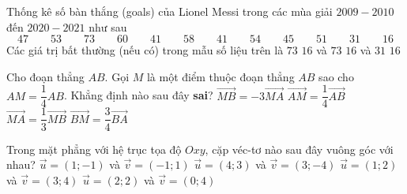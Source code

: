 \begin{ex}%
   Thống kê số bàn thắng (goals) của Lionel Messi trong các mùa giải $2009-2010$ đến $2020-2021$ như sau
   \[47\qquad 53 \qquad 73 \qquad 60 \qquad 41 \qquad 58 \qquad 41 \qquad 54 \qquad 45 \qquad 51\qquad 31 \qquad 16\]
   Các giá trị bất thường (nếu có) trong mẫu số liệu trên là
   \choice
   {$73$}
   {$16$ và $73$}
   {$16$ và $31$}
   {\True $16$}
\end{ex}

\begin{ex}%
   Cho đoạn thẳng $AB$. Gọi $M$ là một điểm thuộc đoạn thẳng $AB$ sao cho $AM=\dfrac{1}{4}AB$. Khẳng định nào sau đây \textbf{sai}?
   \choice
   {$\overrightarrow{MB} = -3\overrightarrow{MA}$}
   {$\overrightarrow{AM} = \dfrac{1}{4}\overrightarrow{AB}$}
   {\True $\overrightarrow{MA} = \dfrac{1}{3}\overrightarrow{MB}$}
   {$\overrightarrow{BM} = \dfrac{3}{4}\overrightarrow{BA}$}
\end{ex}

\begin{ex}%
   Trong mặt phẳng với hệ trục tọa độ $Oxy$, cặp véc-tơ nào sau đây vuông góc với nhau?
   \choice
   {$\overrightarrow{u}=(1;-1)$ và $\overrightarrow{v} = (-1;1)$}
   {\True $\overrightarrow{u}=(4;3)$ và $\overrightarrow{v} = (3;-4)$}
   {$\overrightarrow{u}=(1;2)$ và $\overrightarrow{v} = (3;4)$}
   {$\overrightarrow{u}=(2;2)$ và $\overrightarrow{v}=(0;4)$}
\end{ex}

